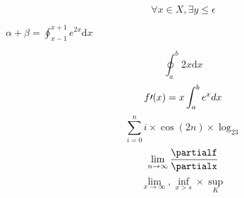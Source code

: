 \documentclass[12pt,a4paper]{article}
\begin{document}
\begin{equation}
\forall x \in X, \exists y \leq \epsilon
\end{equation}

$\alpha+\beta = \oint_{x-1}^{x+1} e^{2x}\mathrm{d}x$

$$ \oint_a^b {2x} \mathrm{d}x $$
$$f\prime(x) = x\int_a^be^xdx \\$$
$$\sum_{i=0}^n i\times\cos(2n) \times \log_23$$
$$\lim_{n\to\infty} \frac{\partialf}{\partialx}$$
$$\lim_{x \to \infty}, \inf_{x > s} \times \sup_K$$
\end{document}
